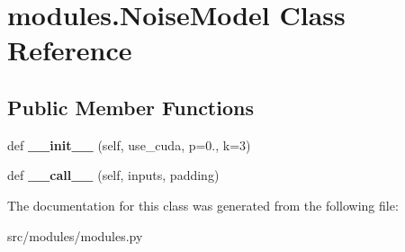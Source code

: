 \hypertarget{classmodules_1_1NoiseModel}{}\section{modules.\+Noise\+Model Class Reference}
\label{classmodules_1_1NoiseModel}
\subsection*{Public Member Functions}
\begin{DoxyCompactItemize}
\item 
def {\bfseries \+\_\+\+\_\+init\+\_\+\+\_\+} (self, use\+\_\+cuda, p=0., k=3)\hypertarget{classmodules_1_1NoiseModel_a7ba85690d21a9ac5048160d8c5f30728}{}\label{classmodules_1_1NoiseModel_a7ba85690d21a9ac5048160d8c5f30728}

\item 
def {\bfseries \+\_\+\+\_\+call\+\_\+\+\_\+} (self, inputs, padding)\hypertarget{classmodules_1_1NoiseModel_a426f9c3c7c042a483b8f7f6beb6742c2}{}\label{classmodules_1_1NoiseModel_a426f9c3c7c042a483b8f7f6beb6742c2}

\end{DoxyCompactItemize}


The documentation for this class was generated from the following file\+:\begin{DoxyCompactItemize}
\item 
src/modules/modules.\+py\end{DoxyCompactItemize}
